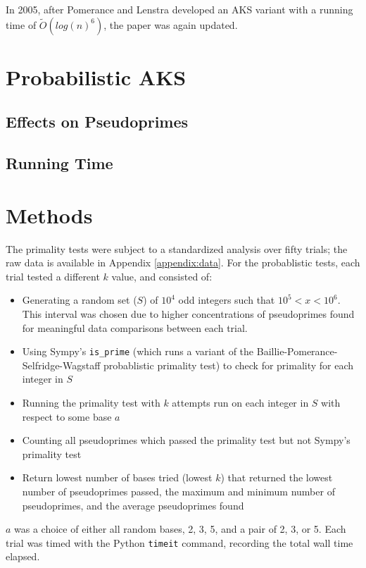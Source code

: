 \documentclass{article}
\begin{document}
In 2005, after Pomerance and Lenstra developed an AKS variant with a running time of $\widetilde{O}(log(n)^{6})$, the paper was again updated.

\section{Probabilistic AKS}

\subsection{Effects on Pseudoprimes}

\subsection{Running Time}

\section{Methods}
The primality tests were subject to a standardized analysis over fifty trials; the raw data is available in Appendix \ref{appendix:data}. For the probablistic tests, each trial tested a different $k$ value, and consisted of:

\begin{itemize}
    \item{Generating a random set ($S$) of $10^4$ odd integers such that $10^5 < x < 10^6$. This interval was chosen due to higher concentrations of pseudoprimes found for meaningful data comparisons between each trial.}
    \item{Using Sympy's \texttt{is\_prime} (which runs a variant of the Baillie-Pomerance-Selfridge-Wagstaff probablistic primality test) to check for primality for each integer in $S$}
    \item{Running the primality test with $k$ attempts run on each integer in $S$ with respect to some base $a$}
    \item{Counting all pseudoprimes which passed the primality test but not Sympy's primality test}
    \item{Return lowest number of bases tried (lowest $k$) that returned the lowest number of pseudoprimes passed, the maximum and minimum number of pseudoprimes, and the average pseudoprimes found}
\end{itemize}

$a$ was a choice of either all random bases, 2, 3, 5, and a pair of 2, 3, or 5. Each trial was timed with the Python \texttt{timeit} command, recording the total wall time elapsed. 
\end{document}
